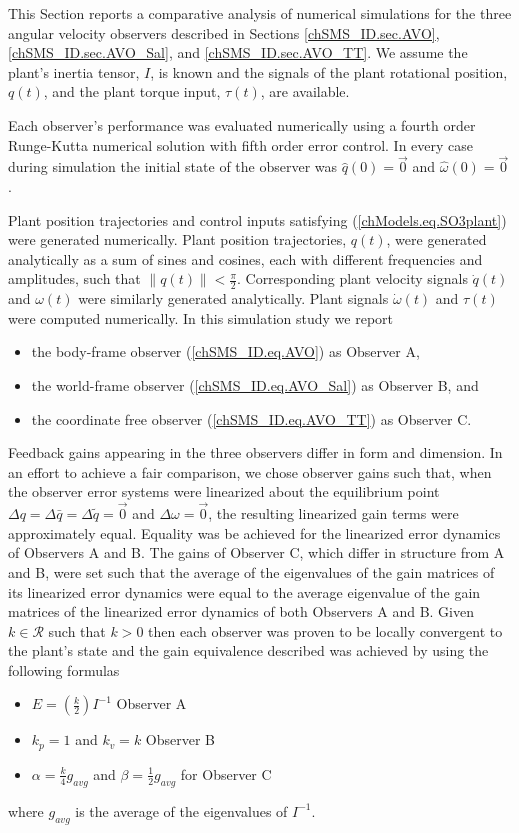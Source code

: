 This Section reports a comparative analysis of numerical simulations
for the three angular velocity observers described in Sections
\ref{chSMS_ID.sec.AVO}, \ref{chSMS_ID.sec.AVO_Sal}, and
\ref{chSMS_ID.sec.AVO_TT}. We assume the plant's inertia tensor, $I$,
is known and the signals of the plant rotational position, $q(t)$, and
the plant torque input, $\tau(t)$, are available.

Each observer's performance was evaluated numerically using
a fourth order Runge-Kutta numerical solution
with fifth order error control. In every case during simulation
the initial state of the observer was $\hat{q}(0)=\vec{0}$ and
$\hat{\omega}(0)=\vec{0}$. 

Plant position trajectories and control inputs satisfying
(\ref{chModels.eq.SO3plant}) were generated numerically.  Plant position
trajectories, $q(t)$, were generated analytically as a sum of sines
and cosines, each with different frequencies and amplitudes, such that
$\|q(t)\|<\frac{\pi}{2}$.  Corresponding plant velocity signals
$\dot{q}(t)$ and $\omega(t)$ were similarly generated analytically.
Plant signals $\dot{\omega}(t)$ and $\tau(t)$ were computed
numerically. In this simulation study we report
\begin{itemize}
\item the body-frame observer (\ref{chSMS_ID.eq.AVO}) as Observer A, 
\item the world-frame observer (\ref{chSMS_ID.eq.AVO_Sal}) as  Observer B, and
\item the coordinate free observer (\ref{chSMS_ID.eq.AVO_TT}) as Observer C.
\end{itemize}

Feedback gains appearing in the three observers differ in form and
dimension.  In an effort to achieve a fair comparison, we chose
observer gains such that, when the observer error systems were
linearized about the equilibrium point $\Delta q=\Delta \bar{q}=\Delta
\tilde{q}=\vec{0}$ and $\Delta \omega=\vec{0}$, the resulting
linearized gain terms were approximately equal.  Equality was be
achieved for the linearized error dynamics of Observers A and B.  The
gains of Observer C, which differ in structure from A and B, were set
such that the average of the eigenvalues of the gain matrices of its
linearized error dynamics were equal to the average eigenvalue of the
gain matrices of the linearized error dynamics of both Observers A and
B. Given $k\in\mathcal{R}$ such that $k>0$ then each observer was
proven to be locally convergent to the plant's state and the gain
equivalence described was achieved by using the following formulas
%
\vspace{5mm}
\begin{itemize}
\item $E=(\frac{k}{2})I^{-1}$ Observer A
\item $k_p=1$ and $k_v=k$ Observer B
\item $\alpha=\frac{k}{4}g_{avg}$ and $\beta=\frac{1}{2}g_{avg}$ for
   Observer C
\end{itemize}
%
where $g_{avg}$ is the average of the eigenvalues of $I^{-1}$.

